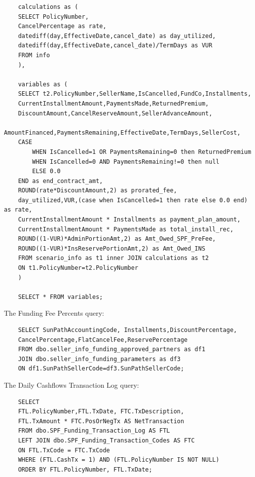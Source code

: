 \documentclass[titlepage]{article}
\begin{document}
\begin{appendices}
\begin{verbatim}
	calculations as (
	SELECT PolicyNumber,
	CancelPercentage as rate,
	datediff(day,EffectiveDate,cancel_date) as day_utilized,
	datediff(day,EffectiveDate,cancel_date)/TermDays as VUR
	FROM info
	),
	
	variables as (
	SELECT t2.PolicyNumber,SellerName,IsCancelled,FundCo,Installments,
	CurrentInstallmentAmount,PaymentsMade,ReturnedPremium,
	DiscountAmount,CancelReserveAmount,SellerAdvanceAmount,
	AmountFinanced,PaymentsRemaining,EffectiveDate,TermDays,SellerCost,
	CASE
		WHEN IsCancelled=1 OR PaymentsRemaining=0 then ReturnedPremium
		WHEN IsCancelled=0 AND PaymentsRemaining!=0 then null
		ELSE 0.0
	END as end_contract_amt,
	ROUND(rate*DiscountAmount,2) as prorated_fee,
	day_utilized,VUR,(case when IsCancelled=1 then rate else 0.0 end) as rate,
	CurrentInstallmentAmount * Installments as payment_plan_amount,
	CurrentInstallmentAmount * PaymentsMade as total_install_rec,
	ROUND((1-VUR)*AdminPortionAmt,2) as Amt_Owed_SPF_PreFee,
	ROUND((1-VUR)*InsReservePortionAmt,2) as Amt_Owed_INS
	FROM scenario_info as t1 inner JOIN calculations as t2
	ON t1.PolicyNumber=t2.PolicyNumber
	)
	
	SELECT * FROM variables;
	\end{verbatim}
	The Funding Fee Percents query:
	\label{appendix:sql4}
	\begin{verbatim}
	SELECT SunPathAccountingCode, Installments,DiscountPercentage,
	CancelPercentage,FlatCancelFee,ReservePercentage 
	FROM dbo.seller_info_funding_approved_partners as df1
	JOIN dbo.seller_info_funding_parameters as df3 
	ON df1.SunPathSellerCode=df3.SunPathSellerCode;
	\end{verbatim}
	The Daily Cashflows Transaction Log query:
	\label{appendix:sql5}
	\begin{verbatim}
	SELECT 
	FTL.PolicyNumber,FTL.TxDate, FTC.TxDescription,
	FTL.TxAmount * FTC.PosOrNegTx AS NetTransaction
	FROM dbo.SPF_Funding_Transaction_Log AS FTL 
	LEFT JOIN dbo.SPF_Funding_Transaction_Codes AS FTC 
	ON FTL.TxCode = FTC.TxCode 
	WHERE (FTL.CashTx = 1) AND (FTL.PolicyNumber IS NOT NULL)
	ORDER BY FTL.PolicyNumber, FTL.TxDate;
	\end{verbatim}
\end{appendices}
\end{document}
